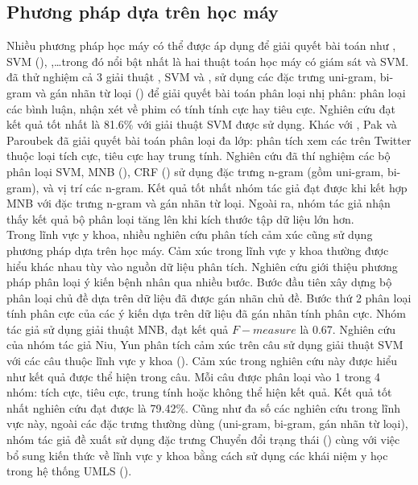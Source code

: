 \subsection{Phương pháp dựa trên học máy}
Nhiều phương pháp học máy có thể được áp dụng để giải quyết bài toán như , SVM (), ,\ldots trong đó nổi bật nhất là hai thuật toán học máy có giám sát  và SVM. \cite{pang2002thumbs} đã thử nghiệm cả 3 giải thuật , SVM và , sử dụng các đặc trưng uni-gram, bi-gram và gán nhãn từ loại () để giải quyết bài toán phân loại nhị phân: phân loại các bình luận, nhận xét về phim có tính tính cực hay tiêu cực. Nghiên cứu đạt kết quả tốt nhất là 81.6\% với giải thuật SVM được sử dụng. Khác với \cite{pang2002thumbs}, Pak và Paroubek đã giải quyết bài toán phân loại đa lớp: phân tích xem các  trên Twitter thuộc loại tích cực, tiêu cực hay trung tính. Nghiên cứu đã thí nghiệm các bộ phân loại SVM, MNB (), CRF () sử dụng đặc trưng n-gram (gồm uni-gram, bi-gram), và vị trí các n-gram. Kết quả tốt nhất nhóm tác giả đạt được khi kết hợp MNB với đặc trưng n-gram và gán nhãn từ loại. Ngoài ra, nhóm tác giả nhận thấy kết quả bộ phân loại tăng lên khi kích thước tập dữ liệu lớn hơn.\\

Trong lĩnh vực y khoa, nhiều nghiên cứu phân tích cảm xúc cũng sử dụng phương pháp dựa trên học máy. Cảm xúc trong lĩnh vực y khoa thường được hiểu khác nhau tùy vào nguồn dữ liệu phân tích.
Nghiên cứu \cite{xia09improving} giới thiệu phương pháp phân loại ý kiến bệnh nhân qua nhiều bước. Bước đầu tiên xây dựng bộ phân loại chủ đề dựa trên dữ liệu đã được gán nhãn chủ đề. Bước thứ 2 phân loại tính phân cực của các ý kiến dựa trên dữ liệu đã gán nhãn tính phân cực. Nhóm tác giả sử dụng giải thuật MNB, đạt kết quả $F-measure$ là 0.67.
Nghiên cứu của nhóm tác giả Niu, Yun \cite{niu2005analysis} phân tích cảm xúc trên câu sử dụng giải thuật SVM với các câu thuộc lĩnh vực y khoa (). Cảm xúc trong nghiên cứu này được hiểu như kết quả  được thể hiện trong câu. Mỗi câu được phân loại vào 1 trong 4 nhóm: tích cực, tiêu cực, trung tính hoặc không thể hiện kết quả. Kết quả tốt nhất nghiên cứu đạt được là 79.42\%. Cũng như đa số các nghiên cứu trong lĩnh vực này, ngoài các đặc trưng thường dùng (uni-gram, bi-gram, gán nhãn từ loại), nhóm tác giả đề xuất sử dụng đặc trưng Chuyển đổi trạng thái () cùng với việc bổ sung kiến thức về lĩnh vực y khoa bằng cách sử dụng các khái niệm y học trong hệ thống UMLS (). 
